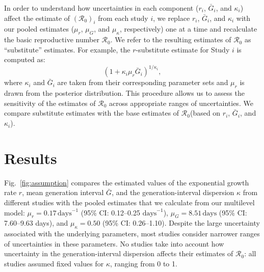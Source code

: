 \documentclass[12pt]{article}
\newcommand{\fref}[1]{Fig.~\ref{fig:#1}}
\newcommand{\Ro}{\ensuremath{{\mathcal R}_{0}}\xspace}
\begin{document}
In order to understand how uncertainties in each component ($r_i$, $\bar G_i$, and $\kappa_i$) affect the estimate of $(\Ro)_i$ from each study $i$, we replace $r_i$, $\bar G_i$, and $\kappa_i$ with our pooled estimates ($\mu_r$, $\mu_G$, and $\mu_\kappa$, respectively) one at a time and recalculate the basic reproductive number \Ro.
We refer to the resulting estimates of \Ro as ``substitute'' estimates.
For example, the $r$-substitute estimate for Study $i$ is computed as:
\begin{equation}
\left(1 + \kappa_i \mu_r \bar{G}_i\right)^{1/\kappa_i},
\end{equation}
where $\kappa_i$ and $\bar{G}_i$ are taken from their corresponding parameter sets and $\mu_r$ is drawn from the posterior distribution.
This procedure allows us to assess the sensitivity of the estimates of \Ro across appropriate ranges of uncertainties.
We compare substitute estimates with the base estimates of \Ro (based on $r_i$, $\bar G_i$, and $\kappa_i$).

\section{Results}

\fref{assumption} compares the estimated values of the exponential growth rate $r$, mean generation interval $\bar G$, and the generation-interval dispersion $\kappa$ from different studies with the pooled estimates that we calculate from our multilevel model:
$\mu_r = 0.17\,\textrm{days}^{-1}$ (95\% CI: 0.12--0.25 $\textrm{days}^{-1}$),
$\mu_G = 8.51\,\textrm{days}$ (95\% CI: 7.60--9.63 days),
and
$\mu_\kappa = 0.50$ (95\% CI: 0.26--1.10).
Despite the large uncertainty associated with the underlying parameters,
most studies consider narrower ranges of uncertainties in these parameters.
No studies take into account how uncertainty in the generation-interval dispersion affects their estimates of \Ro:
all studies assumed fixed values for $\kappa$, ranging from 0 to 1.
\end{document}
